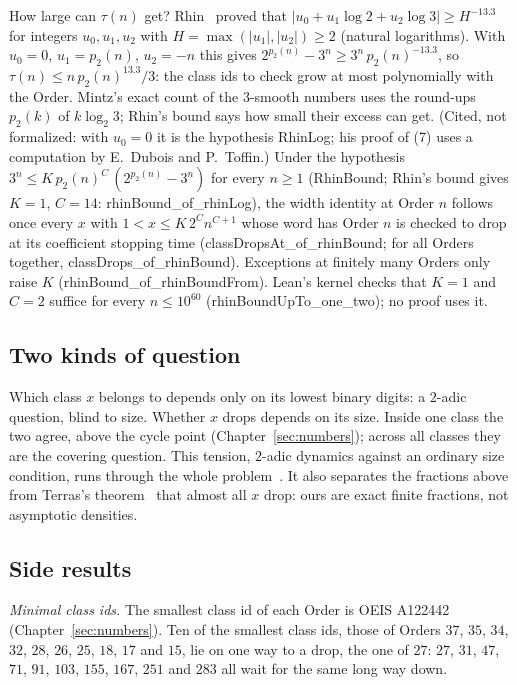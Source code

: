 \documentclass[10pt,a4paper,titlepage]{article}
\newcommand{\lean}[1]{\textsf{#1}}
\begin{document}
How large can $\tau(n)$ get? Rhin~\cite[Proposition, p.~160, (7)]{Rhin1987} proved
that $|u_0 + u_1 \log 2 + u_2 \log 3| \ge H^{-13.3}$ for integers $u_0, u_1, u_2$ with
$H = \max(|u_1|, |u_2|) \ge 2$ (natural logarithms). With $u_0 = 0$, $u_1 = p_2(n)$,
$u_2 = -n$ this gives
$2^{p_2(n)} - 3^n \ge 3^n\,p_2(n)^{-13.3}$, so $\tau(n) \le n\,p_2(n)^{13.3}/3$:
the class ids to check grow at most polynomially with the Order. Mintz's exact
count of the $3$-smooth numbers uses the round-ups $p_2(k)$ of $k\log_2 3$; Rhin's bound says
how small their excess can get. (Cited, not formalized: with $u_0 = 0$ it is the hypothesis \lean{RhinLog}; his proof
of (7) uses a computation by E.~Dubois and P.~Toffin.)
Under the hypothesis $3^n \le K\,p_2(n)^C\,(2^{p_2(n)} - 3^n)$ for every $n \ge 1$
(\lean{RhinBound}; Rhin's bound gives $K = 1$, $C = 14$: \lean{rhinBound\_of\_rhinLog}), the width identity at
Order $n$ follows once every $x$ with $1 < x \le K\,2^C n^{C+1}$ whose word has
Order $n$ is checked to drop at its coefficient stopping time
(\lean{classDropsAt\_of\_rhinBound}; for all Orders together,
\lean{classDrops\_of\_rhinBound}). Exceptions at finitely many Orders only raise
$K$ (\lean{rhinBound\_of\_rhinBoundFrom}). Lean's kernel checks that $K = 1$ and
$C = 2$ suffice for every $n \le 10^{60}$ (\lean{rhinBoundUpTo\_one\_two}); no proof uses it.

\subsection*{Two kinds of question}

Which class $x$ belongs to depends only on its lowest binary digits: a $2$-adic
question, blind to size. Whether $x$ drops depends on its size. Inside one class
the two agree, above the cycle point (Chapter~\ref{sec:numbers}); across all
classes they are the covering question. This tension, $2$-adic dynamics against
an ordinary size condition, runs through the whole problem~\cite{Lagarias1985}.
It also separates the fractions above from Terras's theorem~\cite{Terras1976}
that almost all $x$ drop: ours are exact finite fractions, not asymptotic
densities.

\subsection*{Side results}

\emph{Minimal class ids.} The smallest class id of each Order is OEIS
A122442~\cite{OEIS_A122442} (Chapter~\ref{sec:numbers}). Ten of the smallest class ids, those of Orders $37$, $35$, $34$, $32$, $28$, $26$,
$25$, $18$, $17$ and $15$, lie on one way to a drop, the one of $27$: $27$, $31$, $47$,
$71$, $91$, $103$, $155$, $167$, $251$ and $283$ all wait for the same long way down.
\end{document}
